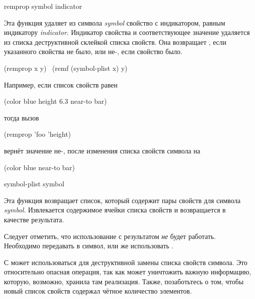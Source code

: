 \begin{defun}[Function]
remprop symbol indicator

Эта функция удаляет из символа \emph{symbol} свойство с индикатором, равным
 индикатору \emph{indicator}. Индикатор свойства и соответствующее
значение удаляется из списка деструктивной склейкой списка свойств. Она
возвращает {\false}, если указанного свойства не было, или не-{\false}, если
свойство было.
\begin{lisp}
(remprop x y) \EQ\ (remf (symbol-plist x) y)
\end{lisp}
Например, если список свойств  равен
\begin{lisp}
(color blue height 6.3 near-to bar)
\end{lisp}
тогда вызов
\begin{lisp}
(remprop 'foo 'height)
\end{lisp}
вернёт значение не-{\nil}, после изменения списка свойств символа  на
\begin{lisp}
(color blue near-to bar)
\end{lisp}
\end{defun}

\begin{defun}[Function]
symbol-plist symbol

Эта функция возвращает список, который содержит пары свойств для символа
\emph{symbol}. Извлекается содержимое ячейки списка свойств и возвращается в
качестве результата.

Следует отметить, что использование  с результатом 
\emph{не} будет работать. Необходимо передавать в  символ, или же
использовать .

С  может использоваться  для деструктивной замены
списка свойств символа. Это относительно опасная операция, так как может
уничтожить важную информацию, которую, возможно, хранила там реализация.
Также, позаботьтесь о том, чтобы новый список свойств содержал чётное количество
элементов.
\end{defun}

